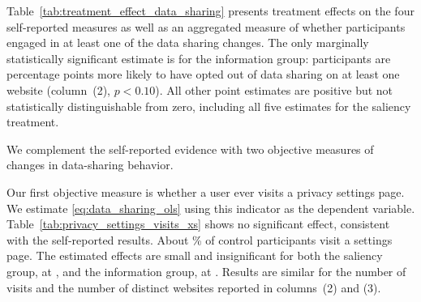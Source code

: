 \documentclass[12pt]{article}
\theoremstyle{definition}
\theoremstyle{remark}
\begin{document}
\begin{appendix}
Table~\ref{tab:treatment_effect_data_sharing} presents treatment effects on the four self-reported measures as well as an aggregated measure of whether participants engaged in at least one of the data sharing changes. The only marginally statistically significant estimate is for the information group: participants are \optOutPP{} percentage points more likely to have opted out of data sharing on at least one website (column~(2), $p < 0.10$). All other point estimates are positive but not statistically distinguishable from zero, including all five estimates for the saliency treatment.

We complement the self-reported evidence with two objective measures of changes in data-sharing behavior. 

Our first objective measure is whether a user ever visits a privacy settings page. We estimate \eqref{eq:data_sharing_ols} using this indicator as the dependent variable. Table~\ref{tab:privacy_settings_visits_xs} shows no significant effect, consistent with the self-reported results. About \settingsEverControlPct{}\% of control participants visit a settings page. The estimated effects are small and insignificant for both the saliency group, at \settingsEverSalCoef{}, and the information group, at \settingsEverInfoCoef{}. Results are similar for the number of visits and the number of distinct websites reported in columns~(2) and (3).

\begin{table}[ht]
\centering
\caption{Treatment Effect on Privacy Settings Page Visits}
\label{tab:privacy_settings_visits_xs}
\scalebox{0.9}{

}
\caption*{\scriptsize \textsc{Notes}: This table reports OLS estimates from Equation~\eqref{eq:data_sharing_ols} on privacy settings page visits during the four-week information intervention. Settings-page visits are identified from keyword-detected page visits in the extension logs, manually classified by the research team. The measure captures visits to settings pages, not whether settings were modified, and coverage is a lower bound since only pages triggering the keyword detector are classified. Column~(1) is an indicator for ever visiting a settings page on at least one website, column~(2) the total number of visits, and column~(3) the number of distinct websites with a settings visit. All specifications include block-by-wave fixed effects, with standard errors clustered at the participant level.}
\end{table}


\end{appendix}
\end{document}
